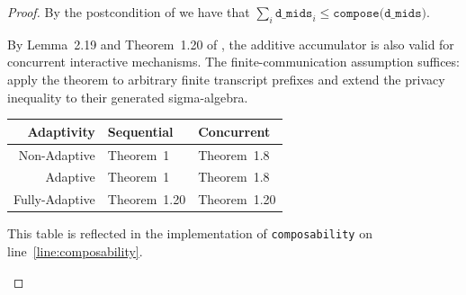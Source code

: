 \documentclass{article}
\begin{document}
\begin{proof}
  By the postcondition of  we have that $\sum_i \texttt{d\_mids}_i \le \texttt{compose(d\_mids)}$.

  By Lemma~2.19 and Theorem~1.20 of \cite{haney2025concurrent}, the additive accumulator is also valid for concurrent interactive mechanisms.
  The finite-communication assumption suffices: apply the theorem to arbitrary finite transcript prefixes and extend the privacy inequality to their generated sigma-algebra.

  \begin{center}
    \begin{tabular}{ r | l l }
      Adaptivity & Sequential & Concurrent \\
      \hline
      Non-Adaptive & Theorem~1\cite{dwork2006calibrating} & Theorem~1.8\cite{vadhan2021concurrent} \\
      Adaptive & Theorem~1\cite{dwork2006calibrating} & Theorem~1.8\cite{vadhan2021concurrent} \\
      Fully-Adaptive & Theorem~1.20\cite{haney2025concurrent} & Theorem~1.20\cite{haney2025concurrent}
    \end{tabular}

    This table is reflected in the implementation of \texttt{composability} on line~\ref{line:composability}.
  \end{center}

\end{proof}



\end{document}
